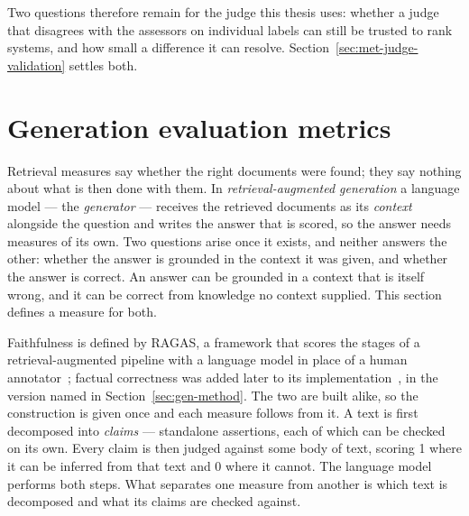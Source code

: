 Two questions therefore remain for the judge this thesis uses: whether a judge that
disagrees with the assessors on individual labels can still be trusted to rank
systems, and how small a difference it can resolve. Section~\ref{sec:met-judge-validation}
settles both.

\section{Generation evaluation metrics}\label{sec:bg-generation-metrics}

Retrieval measures say whether the right documents were found; they say nothing
about what is then done with them. In \emph{retrieval-augmented generation} a
language model --- the \emph{generator} --- receives the retrieved documents as
its \emph{context} alongside the question and writes the answer that is scored, so
the answer needs measures of its own. Two questions arise once it exists, and
neither answers the other: whether the answer is grounded in the context it was
given, and whether the answer is correct. An answer can be grounded in a context
that is itself wrong, and it can be correct from knowledge no context supplied.
This section defines a measure for both.

Faithfulness is defined by RAGAS, a framework that scores the stages of a
retrieval-augmented pipeline with a language model in place of a human
annotator~\cite{es2024ragas}; factual correctness was added later to its
implementation~\cite{ragaslib}, in the version named in
Section~\ref{sec:gen-method}. The two are built alike, so the construction is
given once and each measure follows from it. A text is first decomposed into
\emph{claims} --- standalone assertions, each of which can be checked on its own.
Every claim is then judged against some body of text, scoring 1 where it can be
inferred from that text and 0 where it cannot. The language model performs both
steps. What separates one measure from another is which text is decomposed and
what its claims are checked against.

